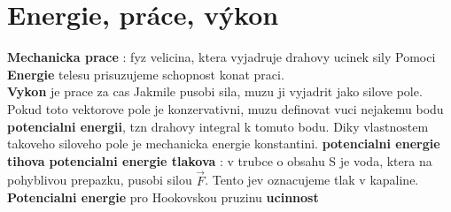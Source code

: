 \documentclass{report}
\newcommand*\diff{\mathop{}\!\mathrm{d}}
\begin{document}

\section{Energie, práce, výkon}
\vspace{0.5cm}
\textbf{Mechanicka prace} : fyz velicina, ktera vyjadruje drahovy ucinek sily
Pomoci \textbf{Energie} telesu prisuzujeme schopnost konat praci. \\
\textbf{Vykon} je prace za cas
Jakmile pusobi sila, muzu ji vyjadrit jako silove pole. Pokud toto vektorove pole je konzervativni, muzu definovat vuci nejakemu bodu \textbf{potencialni energii}, tzn drahovy integral k tomuto bodu. Diky vlastnostem takoveho siloveho pole je mechanicka energie konstantini.
\textbf{potencialni energie tihova}
\textbf{potencialni energie tlakova} : v trubce o obsahu S je voda, ktera na pohyblivou prepazku, pusobi silou $\vec{F}$. Tento jev oznacujeme tlak v kapaline.
\textbf{Potencialni energie} pro Hookovskou pruzinu 
\frm{$E=\int-k y \diff y=-\frac{1}{2}ky^2$} 
\textbf{ucinnost}
\newpage

\end{document}
